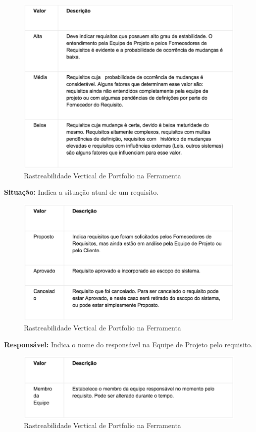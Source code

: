 \begin{figure}[H]
    \centering
	\includegraphics[keepaspectratio=true,scale=0.5]{figuras/atr10.eps}
    \caption{ Rastreabilidade Vertical de Portfolio na Ferramenta}
    \label{fig:ras}
\end{figure}

\textbf{Situação:} Indica a situação atual de um requisito.

\begin{figure}[H]
    \centering
	\includegraphics[keepaspectratio=true,scale=0.5]{figuras/atr4.eps}
    \caption{ Rastreabilidade Vertical de Portfolio na Ferramenta}
    \label{fig:ras}
\end{figure}

\textbf{Responsável:} Indica o nome do responsável na Equipe de Projeto pelo requisito.

\begin{figure}[H]
    \centering
	\includegraphics[keepaspectratio=true,scale=0.5]{figuras/atr5.eps}
    \caption{ Rastreabilidade Vertical de Portfolio na Ferramenta}
    \label{fig:ras}
\end{figure}

